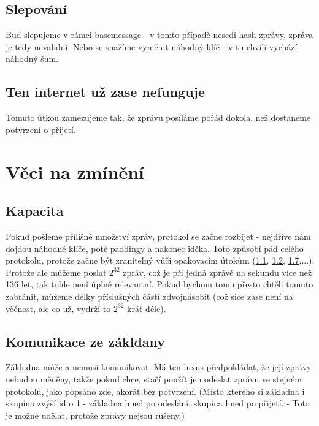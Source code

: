 \documentclass{article}
\begin{document}
\subsection{Slepování}
Buď slepujeme v rámci basemessage - v tomto případě nesedí hash zprávy, zpráva je tedy nevalidní. Nebo se snažíme vyměnit náhodný klíč - v tu chvíli vychází náhodný šum.
\subsection{Ten internet už zase nefunguje}
Tomuto útkou zamezujeme tak, že zprávu posíláme pořád dokola, než dostaneme potvrzení o přijetí.

\section{Věci na zmínění}
\subsection{Kapacita}
Pokud pošleme přílišné množství zpráv, protokol se začne rozbíjet - nejdříve nám dojdou náhodné klíče, poté paddingy a nakonec idčka. Toto způsobí pád celého protokolu, protože začne být
zranitelný vůči opakovacím útokům (\hyperref[1.1]{1.1}, \hyperref[1.2]{1.2}, \hyperref[1.7]{1.7},...). Protože ale můžeme poslat \(2^{32}\) zpráv, což je při jedná zprávé na sekundu více než 136 let,
tak tohle není úplně relevantní. Pokud bychom tomu přesto chtěli tomuto zabránit, můžeme délky příslušných částí zdvojnásobit (což sice zase není na věčnost, ale co už, vydrží to \(2^{32}\)-krát déle).
\subsection{Komunikace ze zákldany}
Základna může a nemusí komunikovat. Má ten luxus předpokládat, že její zprávy nebudou měněny, takže pokud chce, stačí použít jen odeslat zprávu ve stejném protokolu, jako popsáno zde, akorát
bez potvrzení. (Místo kterého si základna i skupina zvýší id o 1 - základna hned po odeslání, skupina hned po přijetí. - Toto je možné udělat, protože zprávy nejsou rušeny.)
\end{document}
